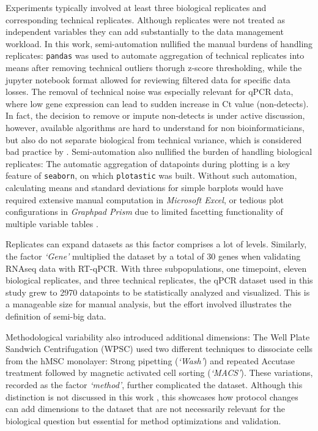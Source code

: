 Experiments typically involved at least three biological replicates
and corresponding technical replicates. Although replicates were not treated as
independent variables 
they can add substantially to the data management workload. In this work,
semi-automation nullified the manual burdens of handling replicates:
\texttt{pandas} was used to automate aggregation of technical replicates into
means after removing technical outliers thorugh z-score thresholding, while the
jupyter notebook format allowed for reviewing filtered data for specific data
losses. The removal of technical noise was especially relevant for qPCR data,
where low gene expression can lead to sudden increase in Ct value
(non-detects). In fact, the decision to remove or impute non-detects is under
active discussion, however, available algorithms are hard to understand for non
bioinformaticians, but also do not separate biological from technical variance,
which is considered bad practice by
\citet{motulskyIntuitiveBiostatisticsNonmathematical2018}
\cite{mccallNondetectsQPCRData2014, sherinaMultipleImputationDirect2020}.
Semi-automation also nullified the burden of handling biological replicates: The
automatic aggregation of datapoints during plotting is a key feature of
\texttt{seaborn}, on which \texttt{plotastic} was built. Without such
automation, calculating means and standard deviations for simple barplots would
have required extensive manual computation in \textit{Microsoft Excel}, or
tedious plot configurations in \textit{Graphpad Prism} due to limited facetting
functionality of multiple variable tables \cite{GraphPadPrism102024}.

Replicates can expand datasets as this factor comprises a lot of levels.
Similarly, the factor \textit{`Gene'} multiplied the dataset by a total of 30
genes when validating RNAseq data with RT-qPCR. With three subpopulations, one
timepoint, eleven biological replicates, and three technical replicates, the
qPCR dataset used in this study grew to 2970 datapoints to be statistically
analyzed and visualized. This is a manageable size for manual analysis, but the
effort involved illustrates the definition of semi-big data.

Methodological variability also introduced additional dimensions: The Well Plate
Sandwich Centrifugation (WPSC) used two different techniques to dissociate
\MAina cells from the hMSC monolayer: Strong pipetting
(\emph{`Wash'}) and repeated Accutase treatment followed by magnetic activated
cell sorting (\emph{`MACS'}). These variations, recorded as the factor
\textit{`method'}, further complicated the dataset. Although this distinction is
not discussed in this work , this
showcases how protocol changes can add dimensions to the dataset that are
not necessarily relevant for the biological question but essential for
method optimizations and validation.



